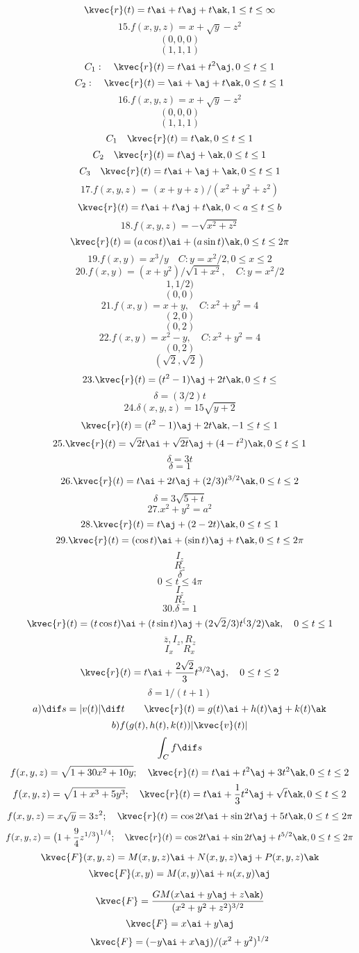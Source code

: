 \[\kvec{r}(t)=t\ai+t\aj+t\ak, 1\le t\le\infty\]
\[15. f(x,y,z)=x+\sqrt{y}-z^{2}\]
\[(0,0,0)\]
\[(1,1,1)\]
\[C_{1}:\quad \kvec{r}(t)=t\ai+t^{2}\aj, 0\le t\le1\]
\[C_{2}:\quad\kvec{r}(t)=\ai+\aj+t\ak, 0\le t\le 1\]
\[16. f(x,y,z)=x+\sqrt{y}-z^{2}\]
\[(0,0,0)\]
\[(1,1,1)\]
\[C_{1}\quad\kvec{r}(t)=t\ak, 0\le t\le 1\]
\[C_{2}\quad\kvec{r}(t)=t\aj+\ak, 0\le t\le1\]
\[C_{3}\quad\kvec{r}(t)=t\ai+\aj+\ak, 0\le t\le 1\]
\[17. f(x,y,z)=(x+y+z)/(x^{2}+y^{2}+z^{2})\]
\[\kvec{r}(t) = t\ai + t\aj + t\ak, 0< a \leq t\leq b\]
\[18. f(x,y,z) = -\sqrt{x^2 + z^2}\]
\[\kvec{r}(t)=(a\cos{t})\ai+(a\sin{t})\ak, 0\le t\le 2\pi\]
\[19.f(x,y)=x^{3}/y\quad C: y=x^{2}/2, 0\le x\le 2\]
\[20. f(x,y)=(x+y^{2})/\sqrt{1+x^{2}},\quad C: y=x^{2}/2\]
\[1,1/2)\]
\[(0,0)\]
\[21. f(x,y)=x+y, \quad C: x^{2}+y^{2}=4\]
\[(2,0)\]
\[(0,2)\]
\[22. f(x,y)=x^{2}-y,\quad C: x^{2}+y^{2}=4\]
\[(0,2)\]
\[(\sqrt{2},\sqrt{2})\]
\[23. \kvec{r}(t)=(t^{2}-1)\aj+2t\ak, 0\le t\le \]
\[\delta=(3/2)t\]
\[24. \delta(x,y,z)=15\sqrt{y+2}\]
\[\kvec{r}(t)=(t^{2}-1)\aj+2t\ak, -1\le t\le 1\]
\[25. \kvec{r}(t)=\sqrt{2}t\ai+\sqrt{2t}\aj+(4-t^{2})\ak, 0\le t\le 1\]
\[\delta=3t\]
\[\delta=1\]
\[26. \kvec{r}(t)=t\ai+2t\aj+(2/3)t^{3/2}\ak, 0\le t\le 2\]
\[\delta=3\sqrt{5+t}\]
\[27. x^{2}+y^{2}=a^{2}\]
\[28. \kvec{r}(t)=t\aj+(2-2t)\ak, 0\le t\le1\]
\[29. \kvec{r}(t)=(\cos{t})\ai+(\sin{t})\aj+t\ak, 0\le t\le 2\pi\]
\[ I_{z}\]
\[R_{z}\]
\[\delta\]
\[0\le t\le 4\pi\]
\[I_{z}\]
\[R_{z}\]
\[30. \delta =1\]
\[\kvec{r}(t) = (t\cos{t})\ai + (t\sin{t})\aj + (2\sqrt{2}/3)t^(3/2)\ak,\quad 0\le t\le1\]
\[\overline{z},I_{z},R_{z}\]
\[I_{x}\quad R_{x}\]
\[\kvec{r}(t) = t\ai + \frac{2\sqrt{2}}{3}t^{3/2}\aj,\quad 0\le t\le 2\]
\[\delta = 1/(t + 1)\]
\[a) \dif s = |v(t)|\dif t\quad\quad \kvec{r}(t) = g(t)\ai + h(t)\aj + k(t)\ak\]
\[b) f(g(t),h(t),k(t))|\kvec{v}(t)|\]
\[\int_{C}f\dif s\]
\[f(x,y,z)=\sqrt{1+30x^{2}+10y};\quad\kvec{r}(t)=t\ai+t^{2}\aj+3t^{2} \ak, 0\le t \le 2\]
\[f(x,y,z)=\sqrt{1+x^{3}+5y^{3}};\quad\kvec{r}(t)=t\ai+\frac{1}{3}t^{2}\aj+\sqrt{t}\ak,  0\le t \le 2\]
\[f(x,y,z)=x\sqrt{y}=3z^{2};\quad \kvec{r}(t)=\cos{2t}\ai+\sin{2t}\aj+5t\ak, 0\le t \le 2\pi\]
\[f(x,y,z)=\big(1+\frac{9}{4}z^{1/3}\big)^{1/4}; \quad\kvec{r}(t)=\cos{2t}\ai+\sin{2t}\aj+t^{5/2}\ak, 0\le t \le 2\pi\]
\[\kvec{F}(x,y,z)=M(x,y,z)\ai+N(x,y,z)\aj+P(x,y,z)\ak\]
\[\kvec{F}(x,y)=M(x,y)\ai+n(x,y)\aj\]

\[\kvec{F}=\frac{GM(x\ai+y\aj+z\ak)}{(x^{2}+y^{2}+z^{2})^{3/2}}\]
\[\kvec{F}=x\ai+y\aj\]
\[\kvec{F}=(-y\ai+x\aj)/(x^{2}+y^{2})^{1/2}\]

